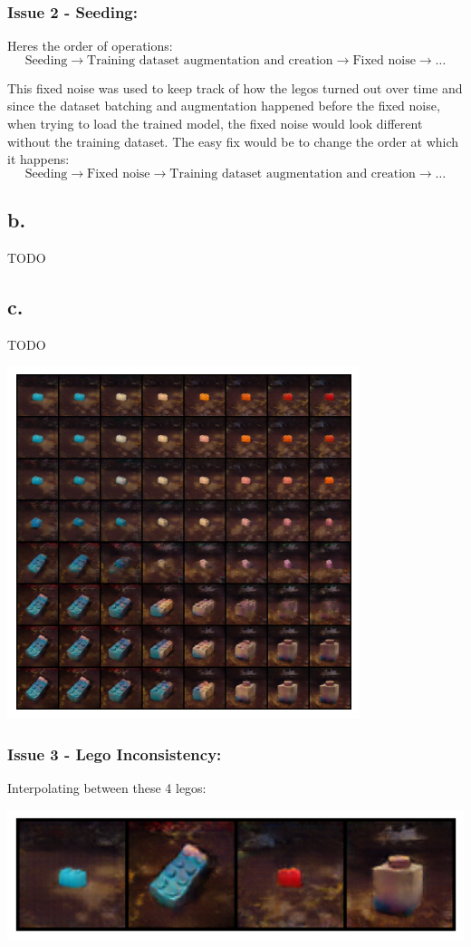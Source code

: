 \documentclass{article}
\begin{document}
\subsubsection*{Issue 2 - Seeding:}
Heres the order of operations:
$$
\text{Seeding}
\rightarrow
\text{Training dataset augmentation and creation}
\rightarrow
\text{Fixed noise}
\rightarrow \dots
$$

\noindent This fixed noise was used to keep track of how the legos turned
out over time and since the dataset batching and augmentation happened before
the fixed noise, when trying to load the trained model, the fixed noise would look
different without the training dataset. The easy fix would be to change the order
at which it happens:
$$
\text{Seeding}
\rightarrow
\text{Fixed noise}
\rightarrow
\text{Training dataset augmentation and creation}
\rightarrow \dots
$$

\subsection*{b.}
TODO

\subsection*{c.}
TODO
\begin{center}
\includegraphics[scale=1]{seed_69,0,23,42,62_interpolation}
\end{center}

\newpage
\subsubsection*{Issue 3 - Lego Inconsistency:}
Interpolating between these 4 legos:
\begin{center}
\includegraphics[scale=0.75]{seed_69,0,23,42,62_legos}
\end{center}
\end{document}
